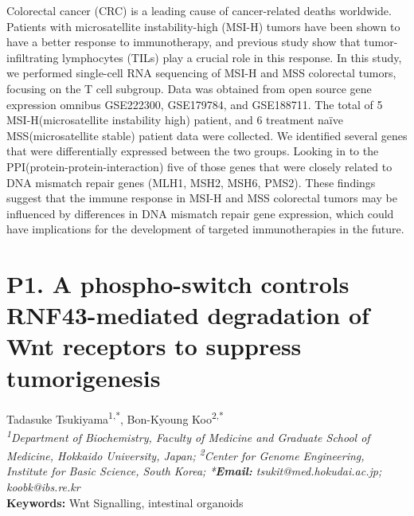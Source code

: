 \noindent
Colorectal cancer (CRC) is a leading cause of cancer-related deaths worldwide. Patients with microsatellite instability-high (MSI-H) tumors have been shown to have a better response to immunotherapy, and previous study show that tumor-infiltrating lymphocytes (TILs) play a crucial role in this response. In this study, we performed single-cell RNA sequencing of MSI-H and MSS colorectal tumors, focusing on the T cell subgroup. Data was obtained from open source gene expression omnibus GSE222300, GSE179784, and GSE188711. The total of 5 MSI-H(microsatellite instability high) patient, and 6 treatment naïve MSS(microsatellite stable) patient data were collected. We identified several genes that were differentially expressed between the two groups. Looking in to the PPI(protein-protein-interaction) five of those genes that were closely related to DNA mismatch repair genes (MLH1, MSH2, MSH6, PMS2). These findings suggest that the immune response in MSI-H and MSS colorectal tumors may be influenced by differences in DNA mismatch repair gene expression, which could have implications for the development of targeted immunotherapies in the future.
\newpage

\section*{P1. A phospho-switch controls RNF43-mediated degradation of Wnt receptors to suppress tumorigenesis}

\begin{center}
Tadasuke Tsukiyama\textsuperscript{1,*}, Bon-Kyoung Koo\textsuperscript{2,*} \\
\vspace{0.3cm}
\textit{\textsuperscript{1}Department of Biochemistry, Faculty of Medicine and Graduate School of Medicine, Hokkaido University, Japan; \textsuperscript{2}Center for Genome Engineering, Institute for Basic Science, South Korea; *\textbf{Email:} tsukit@med.hokudai.ac.jp; koobk@ibs.re.kr} \\
\vspace{0.3cm}
\textbf{Keywords:} Wnt Signalling, intestinal organoids
\end{center}

